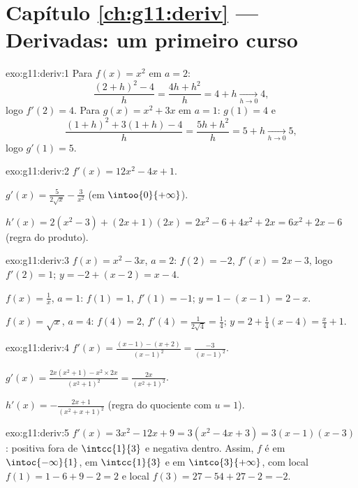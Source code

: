 \section*{Capítulo \ref{ch:g11:deriv} --- Derivadas: um primeiro curso}

\begin{solution}{exo:g11:deriv:1}
Para $f(x) = x^2$ em $a = 2$:
\[
\frac{(2+h)^2 - 4}{h} = \frac{4h + h^2}{h} = 4 + h
\xrightarrow[h\to0]{} 4,
\]
logo $f'(2) = 4$. Para $g(x) = x^2 + 3x$ em $a = 1$: $g(1) = 4$ e
\[
\frac{(1+h)^2 + 3(1+h) - 4}{h} = \frac{5h + h^2}{h} = 5 + h
\xrightarrow[h\to0]{} 5,
\]
logo $g'(1) = 5$.
\end{solution}

\begin{solution}{exo:g11:deriv:2}
$f'(x) = 12x^2 - 4x + 1$.

$g'(x) = \frac{5}{2\sqrt x} - \frac{3}{x^2}$ (em $\intoo{0}{+\infty}$).

$h'(x) = 2(x^2 - 3) + (2x+1)(2x) = 2x^2 - 6 + 4x^2 + 2x
= 6x^2 + 2x - 6$ (regra do produto).
\end{solution}

\begin{solution}{exo:g11:deriv:3}
$f(x) = x^2 - 3x$, $a = 2$: $f(2) = -2$, $f'(x) = 2x - 3$, logo
$f'(2) = 1$;  $y = -2 + (x - 2) = x - 4$.

$f(x) = \frac1x$, $a = 1$: $f(1) = 1$, $f'(1) = -1$; 
$y = 1 - (x - 1) = 2 - x$.

$f(x) = \sqrt x$, $a = 4$: $f(4) = 2$,
$f'(4) = \frac{1}{2\sqrt4} = \frac14$; 
$y = 2 + \frac14(x - 4) = \frac{x}{4} + 1$.
\end{solution}

\begin{solution}{exo:g11:deriv:4}
$f'(x) = \frac{(x-1) - (x+2)}{(x-1)^2} = \frac{-3}{(x-1)^2}$.

$g'(x) = \frac{2x(x^2+1) - x^2 \times 2x}{(x^2+1)^2}
= \frac{2x}{(x^2+1)^2}$.

$h'(x) = -\frac{2x+1}{(x^2+x+1)^2}$ (regra do quociente com $u = 1$).
\end{solution}

\begin{solution}{exo:g11:deriv:5}
$f'(x) = 3x^2 - 12x + 9 = 3(x^2 - 4x + 3) = 3(x-1)(x-3)$: positiva fora
de $\intcc{1}{3}$ e negativa dentro. Assim, $f$ é  em
$\intoc{-\infty}{1}$,  em $\intcc{1}{3}$ e  em
$\intco{3}{+\infty}$, com  local $f(1) = 1 - 6 + 9 - 2 = 2$ e
 local $f(3) = 27 - 54 + 27 - 2 = -2$.
\end{solution}

